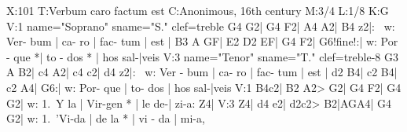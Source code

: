 X:101
T:Verbum caro factum est
C:Anonimous, 16th century
M:3/4
L:1/8
K:G
V:1 name="Soprano" sname="S." clef=treble
G4 G2| G4 F2| A4 A2| B4 z2|: \
w: Ver- bum | ca- ro | fac- tum | est |
B3 A GF| E2 D2 EF| G4 F2| G6!fine!:|
w: Por - que *| to - dos * | hos sal-|veis
V:3 name="Tenor" sname="T." clef=treble-8
G3 A B2| c4 A2| c4 c2| d4 z2|: \
w: Ver - bum | ca- ro | fac- tum | est |
d2 B4| c2 B4| c2 A4| G6:|
w: Por- que | to- dos  | hos sal-|veis
V:1
B4c2| B2 A2> G2| G4 F2| G4 G2|
w: 1.~Y la | Vir-gen * | le de-| zi-a:
Z4|
V:3
Z4|
 d4 e2| d2c2> B2|AGA4| G4 G2|
w: 1.~'Vi-da | de la * | vi - da | mi-a,
